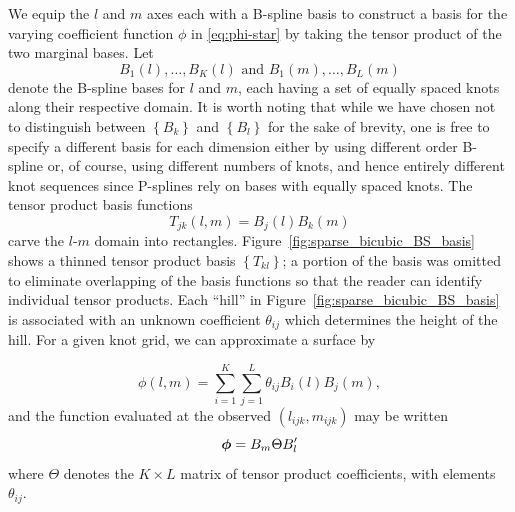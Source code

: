 \documentclass[12pt]{article}
\newcommand{\vphistar}{\mbox{\boldmath $\phi$}}
\theoremstyle{definition}
\begin{document}
We equip the $l$ and $m$ axes each with a B-spline basis to construct a basis for the varying coefficient function $\phi$ in \ref{eq:phi-star} by taking the tensor product of the two marginal bases. Let 
\[
B_{1}\left(l\right),\dots, B_{K}\left(l\right)  \mbox{ and } B_{1}\left(m\right),\dots, B_{L}\left(m\right)
\]
denote the B-spline bases for $l$ and $m$, each having a set of equally spaced knots along their respective domain. It is worth noting that while we have chosen not to distinguish between $\left\{ B_k \right\}$ and $\left\{ {B}_l \right\}$ for the sake of brevity, one is free to specify a different basis for each dimension either by using different order B-spline or, of course, using different numbers of knots, and hence entirely different knot sequences since P-splines rely on bases with equally spaced knots. The tensor product basis functions
\begin{equation*}
T_{jk}\left(l,m\right) = B_j\left(l\right){B}_k\left(m\right)
\end{equation*}
\noindent
carve the $l$-$m$ domain into rectangles.  Figure~\ref{fig:sparse_bicubic_BS_basis} shows a thinned tensor product basis $\left\{ T_{kl} \right\}$; a portion of the basis was omitted to eliminate overlapping of the basis functions so that the reader can identify individual tensor products. Each ``hill'' in Figure~\ref{fig:sparse_bicubic_BS_basis} is associated with an unknown coefficient $\theta_{ij}$ which determines the height of the hill. For a given knot grid, we can approximate a surface by

\begin{equation} \label{eq:varying-coefficient-tensor-product-expansion}
\phi\left(l,m\right) = \sum_{i=1}^K \sum_{j=1}^L \theta_{ij} B_{i}\left(l\right) B_{j}\left(m\right), 
\end{equation}
\noindent
and the function evaluated at the observed $\left(l_{ijk}, m_{ijk}\right)$ may be written 
\begin{equation*} 
\vphistar = B_m \Theta B_l^\prime
\end{equation*}
\noindent 
where $\Theta$ denotes the $K \times L$ matrix of tensor product coefficients, with elements $\theta_{ij}$.
\end{document}
